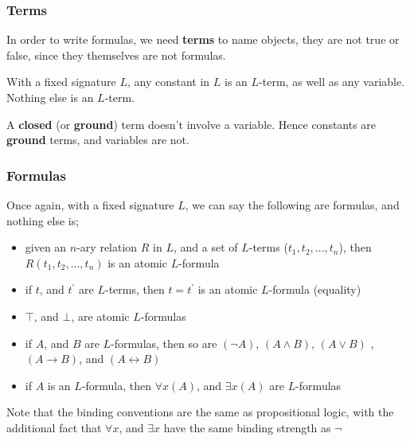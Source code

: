 \documentclass[a4paper, 12pt]{article}
\begin{document}
            \subsubsection*{Terms}
                In order to write formulas, we need \textbf{terms} to name objects, they are not true or false, since they themselves are not formulas.
                \medskip

                With a fixed signature $L$, any constant in $L$ is an $L$-term, as well as any variable. Nothing else is an $L$-term.
                \smallskip

                A \textbf{closed} (or \textbf{ground}) term doesn't involve a variable. Hence constants are \textbf{ground} terms, and variables are not.
            \subsubsection*{Formulas}
                Once again, with a fixed signature $L$, we can say the following are formulas, and nothing else is;
                \begin{itemize}
                    \itemsep0em
                    \item given an $n$-ary relation $R$ in $L$, and a set of $L$-terms ($t_1, t_2, ..., t_n$), then $R(t_1, t_2, ..., t_n)$ is an atomic $L$-formula
                    \item if $t$, and $t^\prime$ are $L$-terms, then $t = t^\prime$ is an atomic $L$-formula (equality)
                    \item $\top$, and $\bot$, are atomic $L$-formulas
                    \item if $A$, and $B$ are $L$-formulas, then so are $(\neg A)$, $(A \land B)$, $(A \lor B)$ , $(A \rightarrow B)$, and $(A \leftrightarrow B)$
                    \item if $A$ is an $L$-formula, then $\forall x (A)$, and $\exists x (A)$ are $L$-formulas
                \end{itemize}
                Note that the binding conventions are the same as propositional logic, with the additional fact that $\forall x$, and $\exists x$ have the same binding strength as $\neg$
                \medskip
\end{document}
